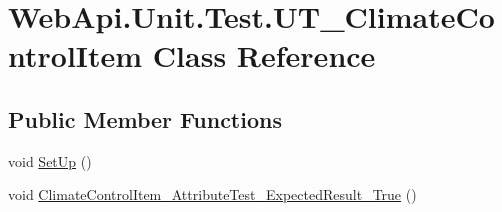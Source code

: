 \hypertarget{class_web_api_1_1_unit_1_1_test_1_1_u_t___climate_control_item}{}\section{Web\+Api.\+Unit.\+Test.\+U\+T\+\_\+\+Climate\+Control\+Item Class Reference}
\label{class_web_api_1_1_unit_1_1_test_1_1_u_t___climate_control_item}
\subsection*{Public Member Functions}
\begin{DoxyCompactItemize}
\item 
void \mbox{\hyperlink{class_web_api_1_1_unit_1_1_test_1_1_u_t___climate_control_item_a14da8b8dd12257a3f76f7e2a97b35e00}{Set\+Up}} ()
\item 
void \mbox{\hyperlink{class_web_api_1_1_unit_1_1_test_1_1_u_t___climate_control_item_a5e9b95f2a37a0b3932fb7d96ad251cb7}{Climate\+Control\+Item\+\_\+\+Attribute\+Test\+\_\+\+Expected\+Result\+\_\+\+True}} ()
\end{DoxyCompactItemize}
